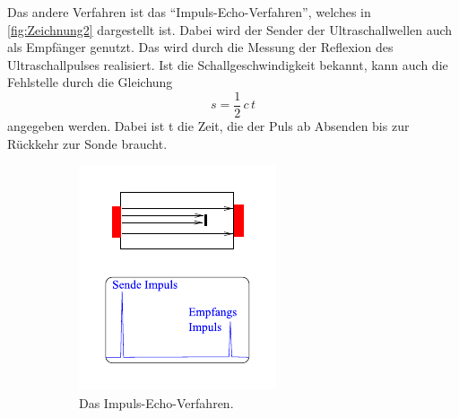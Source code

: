 Das andere Verfahren ist das \enquote{Impuls-Echo-Verfahren}, welches in \autoref{fig:Zeichnung2} dargestellt ist.
Dabei wird der Sender der Ultraschallwellen auch als Empfänger genutzt.
Das wird durch die Messung der Reflexion des Ultraschallpulses realisiert.
Ist die Schallgeschwindigkeit bekannt, kann auch die Fehlstelle durch die Gleichung
\begin{equation}
    s = \frac{1}{2} \, c \, t
\end{equation}
angegeben werden. Dabei ist t die Zeit, die der Puls ab Absenden bis zur Rückkehr zur Sonde braucht.
\begin{figure}
    \centering
    \begin{subfigure}{0.49\columnwidth}
        \centering
        \includegraphics[width=\textwidth]{pictures/Zeichnung1.pdf}
        \caption{Das Impuls-Echo-Verfahren.}
        \label{fig:Zeichnung1}
    \end{subfigure}
    \hfill
    \begin{subfigure}{0.49\columnwidth}
        \centering

\end{subfigure}
\end{figure}

